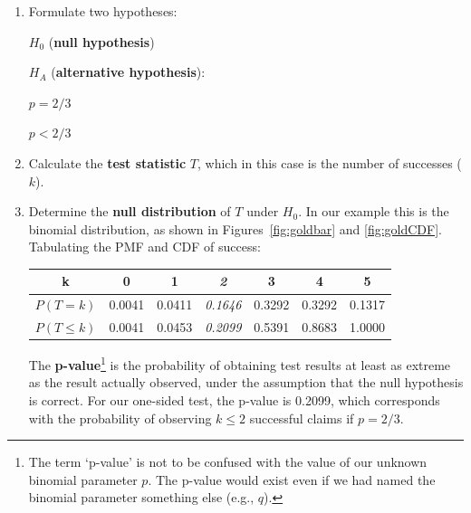 \begin{enumerate}

\item Formulate two hypotheses:\medskip

\noindent\begin{minipage}{.4\textwidth}
  $H_0$ (\textbf{null hypothesis})
  
  \vspace{1em}
  
  $H_{\!A}$ (\textbf{alternative hypothesis}):
\end{minipage}
\begin{minipage}{.2\textwidth}
\end{minipage}
\begin{minipage}{.2\textwidth}
  $p={2/3}$
  
  \vspace{1em}
  
  $p<{2/3}$
\end{minipage}
\begin{minipage}{.2\textwidth}
\end{minipage}\medskip

\item Calculate the \textbf{test statistic} $T$, which in this case is
  the number of successes ($k$).

\item Determine the \textbf{null distribution} of $T$ under
  $H_0$. In our example this is the binomial distribution, as
  shown in Figures~\ref{fig:goldbar} and \ref{fig:goldCDF}. Tabulating
  the PMF and CDF of success:

  \begin{center}
  \begin{tabular}{ccccccc}
    k & 0 & 1 & \textit{2} & 3 & 4 & 5 \\ \hline
    $P(T=k)$ & 0.0041 & 0.0411 & \textit{0.1646} & 0.3292 & 0.3292 & 0.1317 \\
    $P({T}\leq{k})$ & 0.0041 & 0.0453 & \textit{0.2099} & 0.5391 & 0.8683 & 1.0000
  \end{tabular}
  \end{center}

The \textbf{p-value}\footnote{The term `p-value' is not to be confused
  with the value of our unknown binomial parameter $p$. The p-value
  would exist even if we had named the binomial parameter something
  else (e.g., $q$).} is the probability of obtaining test results at
least as extreme as the result actually observed, under the assumption
that the null hypothesis is correct. For our one-sided test, the
p-value is 0.2099, which corresponds with the probability of observing
$k\leq{2}$ successful claims if $p=2/3$.
  

\end{enumerate}
